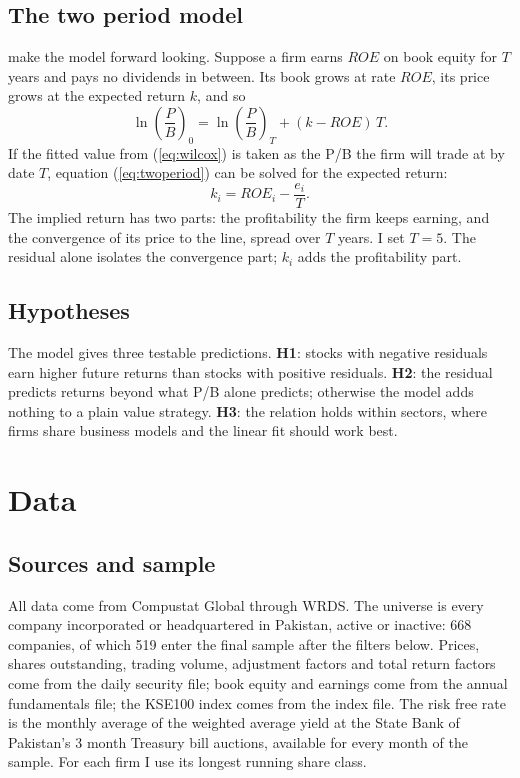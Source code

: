 \documentclass[11pt]{article}
\begin{document}
\subsection{The two period model}

\citet{wilcoxphilips2005} make the model forward looking. Suppose a firm earns $ROE$ on book equity
for $T$ years and pays no dividends in between. Its book grows at rate $ROE$, its price grows at the
expected return $k$, and so
\begin{equation}
\ln\!\left(\frac{P}{B}\right)_{0} = \ln\!\left(\frac{P}{B}\right)_{T} + (k - ROE)\,T.
\label{eq:twoperiod}
\end{equation}
If the fitted value from (\ref{eq:wilcox}) is taken as the P/B the firm will trade at by date $T$,
equation (\ref{eq:twoperiod}) can be solved for the expected return:
\begin{equation}
k_{i} = ROE_{i} - \frac{e_{i}}{T}.
\label{eq:implied}
\end{equation}
The implied return has two parts: the profitability the firm keeps earning, and the convergence of
its price to the line, spread over $T$ years. I set $T = 5$. The residual alone isolates the
convergence part; $k_i$ adds the profitability part.

\subsection{Hypotheses}

The model gives three testable predictions. \textbf{H1}: stocks with negative residuals earn higher
future returns than stocks with positive residuals. \textbf{H2}: the residual predicts returns beyond
what P/B alone predicts; otherwise the model adds nothing to a plain value strategy. \textbf{H3}: the
relation holds within sectors, where firms share business models and the linear fit should work best.

\section{Data}\label{sec:data}

\subsection{Sources and sample}

All data come from Compustat Global through WRDS. The universe is every company incorporated or
headquartered in Pakistan, active or inactive: 668 companies, of which 519 enter the final sample
after the filters below. Prices, shares outstanding, trading volume, adjustment factors and total
return factors come from the daily security file; book equity and earnings come from the annual
fundamentals file; the KSE100 index comes from the index file. The risk free rate is the monthly average of the
weighted average yield at the State Bank of Pakistan's 3 month Treasury bill auctions, available for
every month of the sample. For each firm I use its longest
running share class.
\end{document}
